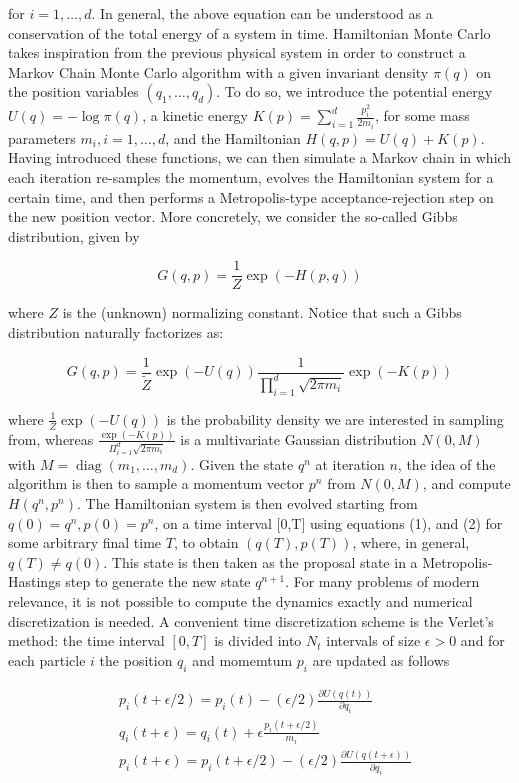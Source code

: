 \documentclass[a4paper, 12pt,oneside]{article}
\begin{document}
			for $i=1, \ldots, d$. In general, the above equation can be understood as a conservation of the total energy of a system in time.
			Hamiltonian Monte Carlo takes inspiration from the previous physical system in order to construct a Markov Chain Monte Carlo algorithm with a given invariant density $\pi(q)$ on the position variables $\left(q_1, \ldots, q_d\right)$. To do so, we introduce the potential energy $U(q)=-\log \pi(q)$, a kinetic energy $K(p)=\sum_{i=1}^d \frac{p_i^2}{2 m_i}$, for some mass parameters $m_i, i=1, \ldots, d$, and the Hamiltonian $H(q, p)=U(q)+K(p)$. Having introduced these functions, we can then simulate a Markov chain in which each iteration re-samples the momentum, evolves the Hamiltonian system for a certain time, and then performs a Metropolis-type acceptance-rejection step on the new position vector. More concretely, we consider the so-called Gibbs distribution, given by

			$$
			G(q, p)=\frac{1}{Z} \exp (-H(p, q))
			$$
			
			where $Z$ is the (unknown) normalizing constant. Notice that such a Gibbs distribution naturally factorizes as:

			$$
			G(q, p)=\frac{1}{\tilde{Z}} \exp (-U(q)) \frac{1}{\prod_{i=1}^d \sqrt{2 \pi m_i}} \exp (-K(p))
			$$
			
			where $\frac{1}{Z} \exp (-U(q))$ is the probability density we are interested in sampling from, whereas $\frac{\exp (-K(p))}{\Pi_{i=1}^d \sqrt{2 \pi m_i}}$ is a multivariate Gaussian distribution $N(0, M)$ with $M=\operatorname{diag}\left(m_1, \ldots, m_d\right)$. Given the state $q^n$ at iteration $n$, the idea of the algorithm is then to sample a momentum vector $p^n$ from $N(0, M)$, and compute $H\left(q^n, p^n\right)$. The Hamiltonian system is then evolved starting from $q(0)=q^n, p(0)=p^n$, on a time interval [0,T] using equations (1), and (2) for some arbitrary final time $T$, to obtain $(q(T), p(T))$, where, in general, $q(T) \neq q(0)$. This state is then taken as the proposal state in a Metropolis-Hastings step to generate the new state $q^{n+1}$. For many problems of modern relevance, it is not possible to compute the dynamics exactly and numerical discretization is needed. A convenient time discretization scheme is the Verlet's method: the time interval $[0, T]$ is divided into $N_t$ intervals of size $\epsilon>0$ and for each particle $i$ the position $q_i$ and momemtum $p_i$ are updated as follows
			
			$$
			\begin{aligned}
			& p_i(t+\epsilon / 2)=p_i(t)-(\epsilon / 2) \frac{\partial U(q(t))}{\partial q_i} \\
			& q_i(t+\epsilon)=q_i(t)+\epsilon \frac{p_i(t+\epsilon / 2)}{m_i} \\
			& p_i(t+\epsilon)=p_i(t+\epsilon / 2)-(\epsilon / 2) \frac{\partial U(q(t+\epsilon))}{\partial q_i}
			\end{aligned}
			$$
			
\end{document}
